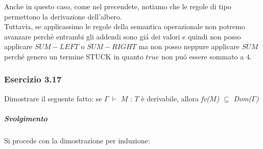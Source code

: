 Anche in questo caso, come nel precendete, notiamo che le regole di tipo permettono la derivazione dell'albero.\\
Tuttavia, se applicassimo le regole della semantica operazionale non potremo avanzare perch\`e entrambi gli addendi sono gi\'a dei valori e quindi non posso applicare $SUM-LEFT$ o $SUM-RIGHT$ ma non posso neppure applicare $SUM$ perch\'e genero un termine STUCK in quanto $true$ non pu\'o essere sommato a $4$.

\subsubsection*{Esercizio 3.17}

Dimostrare il seguente fatto: se $\Gamma\:\vdash$ $M$ : $T$ \`e derivabile, allora  \textit{fv($M$)}  $\subseteq$ \textit{Dom($\Gamma$)}
\subparagraph*{Svolgimento}

Si procede con la dimostrazione per induzione:

